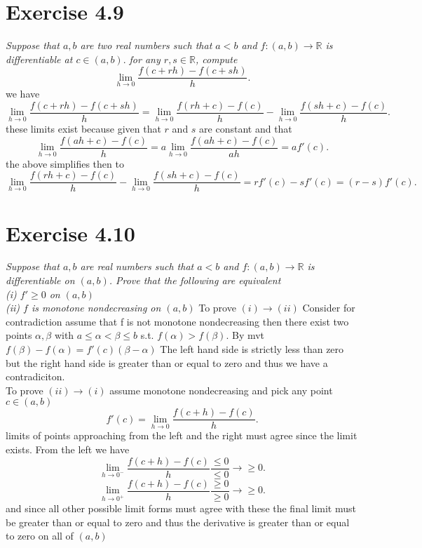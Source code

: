 \documentclass{amsart}
\begin{document}
    \section{Exercise 4.9}
    \emph{Suppose that $a,b$ are two real numbers such that $a < b$ and $f : (a,b) \rightarrow \mathbb{R} $ is differentiable at $c \in (a,b).$
        for any $r,s \in \mathbb{R} $, compute
        \[
        \lim_{h\to 0 } \frac{f(c+rh) - f(c+sh)}{h}
        .\] 
    }
    we have 
    \[
        \lim_{h\to 0 } \frac{f(c+rh) - f(c+sh)}{h} = \lim_{h\to 0 } \frac{f(rh+c) -f(c)}{h} - \lim_{h\to 0} \frac{f(sh+c)-f(c)}{h}
    .\] 
    these limits exist because given that $r$ and $s$ are constant and that
    \[
    \lim_{h\to 0}\frac{f(ah+c)-f(c)}{h} = a\lim_{h\to 0} \frac{f(ah+c) - f(c)}{ah} = af'(c)
    .\] 
    the above simplifies then to
    \[
    \lim_{h\to 0 } \frac{f(rh+c) -f(c)}{h} - \lim_{h\to 0} \frac{f(sh+c)-f(c)}{h} = rf'(c) - sf'(c) = (r-s)f'(c)
    .\] 

    \section{Exercise 4.10}
        \emph{Suppose that $a,b$ are real numbers such that $a < b$ and $f : (a,b) \rightarrow \mathbb{R} $ is 
        differentiable on $(a,b)$. Prove that the following are equivalent\\
        (i) $f' \ge 0$ on $(a,b)$ \\
    (ii) $f$ is monotone nondecreasing on $(a,b)$}
    To prove $(i) \rightarrow (ii)$ Consider for contradiction assume that f is not monotone nondecreasing
    then there exist two points $\alpha, \beta$ with $a \le \alpha < \beta \le b$ s.t. $f(\alpha) > f(\beta)$.
    By mvt $f(\beta)-f(\alpha)=f'(c)(\beta-\alpha)$ The left hand side is strictly less than zero but the
    right hand side is greater than or equal to zero and thus we have a contradiciton.\\
    To prove $(ii) \rightarrow (i)$ assume monotone nondecreasing and pick any point $c \in (a,b)$
     \[
    f'(c) = \lim_{h\to 0} \frac{f(c+h)-f(c)}{h}
    .\] 
    limits of points approaching from the left and the right must agree since the limit exists.
    From the left we have
    \[
    \lim_{h\to 0^{-}} \frac{f(c+h)-f(c)}{h} \frac{ \le 0}{ \le 0} \rightarrow \ge 0
    .\] 
    \[
    \lim_{h\to 0^{+}} \frac{f(c+h)-f(c)}{h} \frac{ \ge 0}{ \ge 0} \rightarrow \ge 0
    .\] 
    and since all other possible limit forms must agree with these the final limit must be greater than or equal to zero and thus
    the derivative is greater than or equal to zero on all of $(a,b)$
\end{document}
